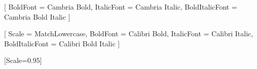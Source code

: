 
\usepackage{fontspec}

\setmainfont{Cambria}[
  BoldFont       = {Cambria Bold},
  ItalicFont     = {Cambria Italic},
  BoldItalicFont = {Cambria Bold Italic}
]

\setsansfont{Calibri}[
  Scale          = MatchLowercase,
  BoldFont       = {Calibri Bold},
  ItalicFont     = {Calibri Italic},
  BoldItalicFont = {Calibri Bold Italic}
]

\setmonofont{Consolas}[Scale=0.95]

\usepackage{unicode-math}
\usepackage{amsmath}
\usepackage{amssymb}
\usepackage{amsthm}
\usepackage{mathtools}


\usepackage{xcolor}

\usepackage[
  top      = 2.5cm,
  bottom   = 3.0cm,
  inner    = 3.0cm,
  outer    = 2.2cm,
  headheight = 14pt,
  headsep    = 0.6cm
]{geometry}

